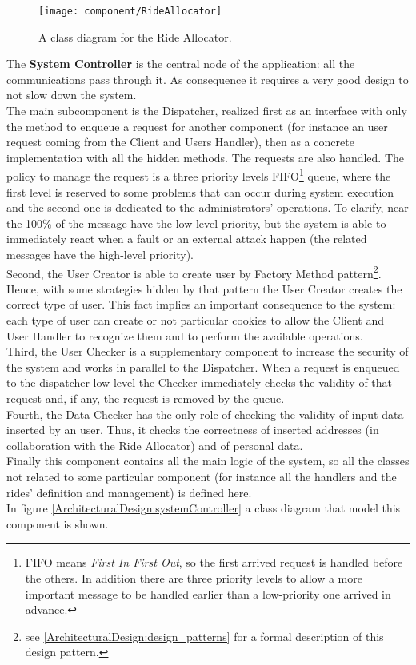 \documentclass[\mainpath/main]{subfiles}
\begin{document}
\begin{figure}[h!]
	\centering
	\texttt{[image: component/RideAllocator]}
	\caption{A class diagram for the Ride Allocator.}
	\label{ArchitecturalDesign:rideAllocator}
\end{figure}

The \textbf{System Controller} is the central node of the application: all the communications pass through it. As consequence it requires a very good design to not slow down the system.\\
The main subcomponent is the Dispatcher, realized first as an interface with only the method to enqueue a request for another component (for instance an user request coming from the Client and Users Handler), then as a concrete implementation with all the hidden methods. The requests are also handled. The policy to manage the request is a three priority levels FIFO\footnote{FIFO means \textit{First In First Out}, so the first arrived request is handled before the others. In addition there are three priority levels to allow a more important message to be handled earlier than a low-priority one arrived in advance.} queue, where the first level is reserved to some problems that can occur during system execution and the second one is dedicated to the administrators' operations. To clarify, near the 100\% of the message have the low-level priority, but the system is able to immediately react when a fault or an external attack happen (the related messages have the high-level priority).\\
Second, the User Creator is able to create user by Factory Method pattern\footnote{see \autoref{ArchitecturalDesign:design_patterns} for a formal description of this design pattern.}. Hence, with some strategies hidden by that pattern the User Creator creates the correct type of user. This fact implies an important consequence to the system: each type of user can create or not particular cookies to allow the Client and User Handler to recognize them and to perform the available operations.\\
Third, the User Checker is a supplementary component to increase the security of the system and works in parallel to the Dispatcher. When a request is enqueued to the dispatcher low-level the Checker immediately checks the validity of that request and, if any, the request is removed by the queue.\\
Fourth, the Data Checker has the only role of checking the validity of input data inserted by an user. Thus, it checks the correctness of inserted addresses (in collaboration with the Ride Allocator) and of personal data.\\
Finally this component contains all the main logic of the system, so all the classes not related to some particular component (for instance all the handlers and the rides' definition and management) is defined here.\\
In figure \ref{ArchitecturalDesign:systemController} a class diagram that model this component is shown.
\end{document}
